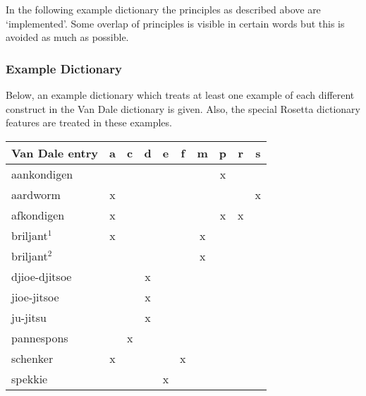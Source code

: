 In the following example dictionary the principles as described above are
`implemented'. Some overlap of principles is visible in certain words but this 
is avoided as much as possible.
 
\subsubsection{Example Dictionary}
 
Below, an example dictionary which treats at least one example of each different
construct in the Van Dale dictionary is given. Also, the special Rosetta 
dictionary features are treated in these examples.\vspace{3mm}
 
\begin{tabular}{|l||c|c|c|c|c|c|c|c|c||}    \hline
  Van Dale entry   &a&c&d&e&f&m&p&r&s     \\ \hline
  aankondigen      & & & & & & &x& &      \\
  aardworm         &x& & & & & & & &x     \\
  afkondigen       &x& & & & & &x&x&      \\
  briljant$^1$     &x& & & & &x& & &      \\
  briljant$^2$     & & & & & &x& & &      \\
  djioe-djitsoe    & & &x& & & & & &      \\
  jioe-jitsoe      & & &x& & & & & &      \\
  ju-jitsu         & & &x& & & & & &      \\
  pannespons       & &x& & & & & & &      \\
  schenker         &x& & & &x& & & &      \\ 
  spekkie          & & & &x& & & & &      \\ \hline
\end{tabular}
 

